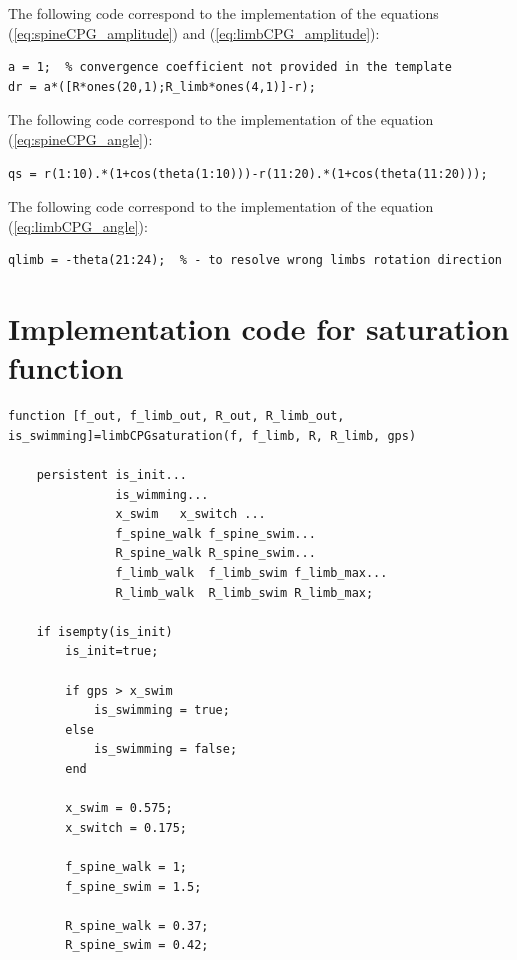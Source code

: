 \documentclass[a4paper]{scrartcl}
\begin{document}
{{The following code correspond to the implementation of the equations (\ref{eq:spineCPG_amplitude}) and (\ref{eq:limbCPG_amplitude}):
\begin{lstlisting}[style=Matlab-editor,basicstyle=\mlttfamily,numbers=none]
a = 1;  % convergence coefficient not provided in the template
dr = a*([R*ones(20,1);R_limb*ones(4,1)]-r);
\end{lstlisting} 

The following code correspond to the implementation of the equation (\ref{eq:spineCPG_angle}):
\begin{lstlisting}[style=Matlab-editor,basicstyle=\mlttfamily,numbers=none]
qs = r(1:10).*(1+cos(theta(1:10)))-r(11:20).*(1+cos(theta(11:20)));
\end{lstlisting} 

The following code correspond to the implementation of the equation (\ref{eq:limbCPG_angle}):
\begin{lstlisting}[style=Matlab-editor,basicstyle=\mlttfamily,numbers=none]
qlimb = -theta(21:24);	% - to resolve wrong limbs rotation direction 
\end{lstlisting} 

\section{Implementation code for saturation function}\label{appedix:code_saturation}
\begin{lstlisting}[style=Matlab-editor,basicstyle=\mlttfamily,numbers=none]
function [f_out, f_limb_out, R_out, R_limb_out, is_swimming]=limbCPGsaturation(f, f_limb, R, R_limb, gps)

    persistent is_init...
               is_wimming...
               x_swim   x_switch ...
               f_spine_walk f_spine_swim...
               R_spine_walk R_spine_swim...
               f_limb_walk  f_limb_swim f_limb_max...
               R_limb_walk  R_limb_swim R_limb_max;
           
    if isempty(is_init)
        is_init=true;
        
        if gps > x_swim
            is_swimming = true;
        else
            is_swimming = false;
        end
        
        x_swim = 0.575;
        x_switch = 0.175;
        
        f_spine_walk = 1;
        f_spine_swim = 1.5;
        
        R_spine_walk = 0.37;
        R_spine_swim = 0.42;
        

\end{lstlisting}}}
\end{document}
